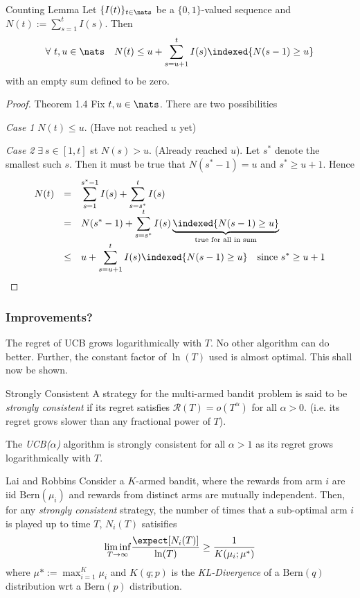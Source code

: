 \documentclass[11pt,a4paper]{article}
\begin{document}
\begin{theorem}{Counting Lemma}
  Let $\{I(t)\}_{t\in\nats}$ be a $\{0,1\}$-valued sequence and $N(t):=\sum_{s=1}^tI(s)$. Then
  \[ \forall\ t,u\in\nats\quad N(t)\leq u+\sum_{s=u+1}^tI(s)\indexed\{N(s-1)\geq u\} \]
  with an empty sum defined to be zero.
\end{theorem}

\begin{proof}{Theorem 1.4}
  Fix $t,u\in\nats$. There are two possibilities
  \par\textit{Case 1} $N(t)\leq u$. (Have not reached $u$ yet)

  \par\textit{Case 2} $\exists\ s\in[1,t]$ st $N(s)>u$. (Already reached $u$). Let $s^*$ denote the smallest such $s$. Then it must be true that $N(s^*-1)=u$ and $s^*\geq u+1$. Hence
  \[\begin{array}{rcl}
    N(t)&=&\displaystyle\sum_{s=1}^{s^*-1}I(s)+\sum_{s=s^*}^tI(s)\\
    &=&\displaystyle N(s^*-1)+\sum_{s=s^*}^tI(s)\underbrace{\indexed\{N(s-1)\geq u\}}_{\tiny\text{true for all in sum}}\\
    &\leq&\displaystyle u+\sum_{s=u+1}^tI(s)\indexed\{N(s-1)\geq u\}\quad\text{since }s^*\geq u+1
  \end{array}\]
  \proved
\end{proof}

\subsubsection{Improvements?}

\begin{remark}{The regret of UCB grows logarithmically with $T$. No other algorithm can do better.}
  Further, the constant factor of $\ln(T)$ used is almost optimal. This shall now be shown.
\end{remark}

\begin{definition}{Strongly Consistent}
  A strategy for the multi-armed bandit problem is said to be \textit{strongly consistent} if its regret satisfies $\mathcal{R}(T)=o(T^\alpha)$ for all $\alpha>0$. (i.e. its regret grows slower than any fractional power of $T$).
  \par The \textit{UCB($\alpha$)} algorithm is strongly consistent for all $\alpha>1$ as its regret grows logarithmically with $T$.
\end{definition}

\begin{theorem}{Lai and Robbins}
  Consider a $K$-armed bandit, where the rewards from arm $i$ are iid $\text{Bern}(\mu_i)$ and rewards from distinct arms are mutually independent. Then, for any \textit{strongly consistent} strategy, the number of times that a sub-optimal arm $i$ is played up to time $T$, $N_i(T)$ satisifies
  \[ \underset{T\to\infty}{\lim\inf}\frac{\expect[N_i(T)]}{\ln(T)}\geq\frac1{K(\mu_i;\mu^*)} \]
  where $\mu*:=\max_{i=1}^K\mu_i$ and $K(q;p)$ is the \textit{KL-Divergence} of a $\text{Bern}(q)$ distribution wrt a $\text{Bern}(p)$ distribution.
\end{theorem}
\end{document}
